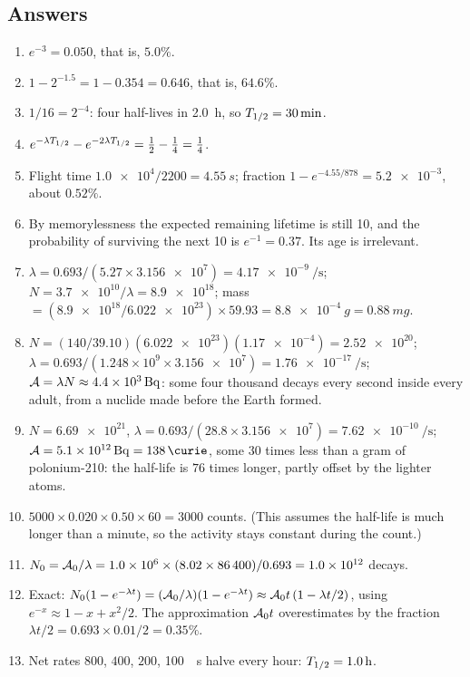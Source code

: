 \subsection*{Answers}
{\small
\begin{enumerate}[itemsep=2pt]
\item $e^{-3}=0.050$, that is, $5.0\%$.
\item $1-2^{-1.5}=1-0.354=0.646$, that is, $64.6\%$.
\item $1/16=2^{-4}$: four half-lives in \SI{2.0}{h}, so $T_{1/2}=\SI{30}{min}$.
\item $e^{-\lambda T_{1/2}}-e^{-2\lambda T_{1/2}}=\tfrac12-\tfrac14=\tfrac14$.
\item Flight time $\num{1.0e4}/2200=\SI{4.55}{s}$; fraction $1-e^{-4.55/878}=\num{5.2e-3}$, about
      $0.52\%$.
\item By memorylessness the expected remaining lifetime is still \SI{10}{\year}, and the probability of
      surviving the next \SI{10}{\year} is $e^{-1}=0.37$. Its age is irrelevant.
\item $\lambda=0.693/(5.27\times\num{3.156e7})=\SI{4.17e-9}{\per\second}$; $N=\num{3.7e10}/\lambda=\num{8.9e18}$;
      mass $=(\num{8.9e18}/\num{6.022e23})\times59.93=\SI{8.8e-4}{g}=\SI{0.88}{mg}$.
\item $N=(140/39.10)(\num{6.022e23})(\num{1.17e-4})=\num{2.52e20}$; $\lambda=0.693/(1.248\times10^{9}\times\num{3.156e7})
      =\SI{1.76e-17}{\per\second}$; $\Act=\lambda N\approx\SI{4.4e3}{\becquerel}$: some four thousand
      decays every second inside every adult, from a nuclide made before the Earth formed.
\item $N=\num{6.69e21}$, $\lambda=0.693/(28.8\times\num{3.156e7})=\SI{7.62e-10}{\per\second}$;
      $\Act=\SI{5.1e12}{\becquerel}=\SI{138}{\curie}$, some $30$ times less than a gram of polonium-210:
      the half-life is $76$ times longer, partly offset by the lighter atoms.
\item $5000\times0.020\times0.50\times60=3000$ counts. (This assumes the half-life is much longer than a
      minute, so the activity stays constant during the count.)
\item $N_0=\mathcal{A}_0/\lambda=\num{1.0e6}\times(8.02\times86\,400)/0.693=\num{1.0e12}$ decays.
\item Exact: $N_0(1-e^{-\lambda t})=(\mathcal{A}_0/\lambda)(1-e^{-\lambda t})\approx\mathcal{A}_0t\,(1-\lambda t/2)$, using
      $e^{-x}\approx1-x+x^2/2$. The approximation $\mathcal{A}_0t$ overestimates by the fraction
      $\lambda t/2=0.693\times0.01/2=0.35\%$.
\item Net rates $800$, $400$, $200$, \SI{100}{\per\second} halve every hour: $T_{1/2}=\SI{1.0}{h}$.

\end{enumerate}}
